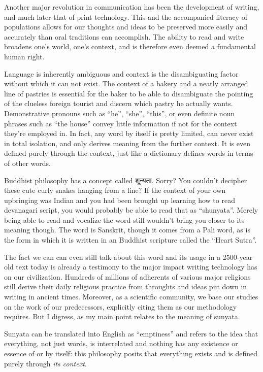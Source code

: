 Another major revolution in communication has been the development of writing,
and much later that of print technology. This and the accompanied literacy of
populations allows for our thoughts and ideas to be preserved more easily and
accurately than oral traditions can accomplish. The ability to read and write
broadens one's world, one's context, and is therefore even deemed a fundamental
human right. 

Language is inherently ambiguous and context is the disambiguating factor
without which it can not exist. The context of a bakery and a neatly arranged
line of pastries is essential for the baker to be able to disambiguate the
pointing of the clueless foreign tourist and discern which pastry he actually
wants. Demonstrative pronouns such as ``he'', ``she'', ``this'', or even
definite noun phrases such as ``the house'' convey little information if not
for the context they're employed in.  In fact, any word by itself is pretty
limited, can never exist in total isolation, and only derives meaning from the
further context. It is even defined purely through the context, just like a
dictionary defines words in terms of other words.

Buddhist philosophy has a concept called शून्यता. Sorry? You couldn't decipher
these cute curly snakes hanging from a line? If the context of your own
upbringing was Indian and you had been brought up learning how to read
devanagari script, you would probably be able to read that as ``shunyata''.
Merely being able to read and vocalize the word still wouldn't bring you closer
to its meaning though. The word is Sanskrit, though it comes from a Pali word,
as is the form in which it is written in an Buddhist scripture called the
``Heart Sutra''. 

The fact we can can even still talk about this word and its usage in a
2500-year old text today is already a testimony to the major impact writing
technology has on our civilization. Hundreds of millions of adherents of
various major religions still derive their daily religious practice from
throughts and ideas put down in writing in ancient times. Moreover, as a
scientific community, we base our studies on the work of our predecessors,
explicitly citing them as our methodology requires. But I digress, as my
main point relates to the meaning of sunyata. 

Sunyata can be translated into English as ``emptiness'' and refers to the idea
that everything, not just words, is interrelated and nothing has any existence
or essence of or by itself: this philosophy posits that everything exists and
is defined purely through \emph{its context}.

